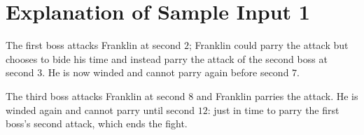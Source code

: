 \section*{Explanation of Sample Input 1}
The first boss attacks Franklin at second $2$; Franklin could parry the attack but chooses to bide his time and instead parry the attack of the second boss at second $3$. He is now winded and cannot parry again before second $7$.

The third boss attacks Franklin at second $8$ and Franklin parries the attack. He is winded again and cannot parry until second $12$: just in time to parry the first boss's second attack, which ends the fight.